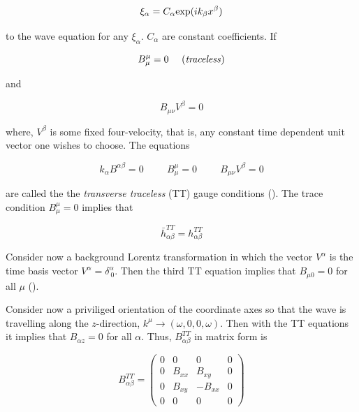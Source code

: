 \documentclass[epsf]{article}
\begin{document}
\begin{equation}
\xi_{\alpha} = C_{\alpha} {\rm exp}(i k_{\beta} x^{\beta})
\end{equation}

to the wave equation for any $\xi_{\alpha}$. $C_{\alpha}$ are constant 
coefficients. If

\begin{equation}
B^{\mu}_{\mu} = 0 ~~~~({\rm \it traceless})
\end{equation}

and

\begin{equation}
B_{\mu\nu} V^{\beta} = 0
\end{equation}

where, $V^{\beta}$ is some fixed four-velocity, that is, any constant 
time dependent unit vector one wishes to choose. The equations

\begin{equation}
\boxed{k_{\alpha} B^{\alpha\beta} = 0 \hspace{1cm}
B^{\mu}_{\mu} = 0 \hspace{1cm}
B_{\mu\nu} V^{\beta} = 0}
\end{equation}

 are called the the {\it transverse traceless} (TT) gauge 
conditions (\cite{schutz,maggiore,ian,chaky}). The trace condition $B^{\mu}_{\mu} = 0$ implies that

\begin{equation}
\bar{h}^{TT}_{\alpha\beta} = h^{TT}_{\alpha\beta}
\end{equation}

Consider now a background Lorentz transformation in
which the vector $V^{\alpha}$ is the time basis vector $V^{\alpha} = 
\delta^{\alpha}_{~0}$. Then the third TT equation implies that $B_{\mu 0} = 0$ for all
$\mu$ (\cite{maggiore,chaky}). 

Consider now a priviliged orientation of the coordinate axes so that the wave is travelling 
along the $z$-direction, $k^{\mu} \rightarrow (\omega, 0, 0, \omega)$. 
Then with the TT equations it implies that $B_{\alpha z} = 0$ for all
$\alpha$. Thus, $B^{TT}_{\alpha\beta}$ in matrix form is 

\begin{equation}
B^{TT}_{\alpha\beta} = \left( \begin{array}{cccc}
              0 & 0 & 0 & 0 \\
              0 & B_{xx} & B_{xy} & 0 \\
              0 & B_{xy} & -B_{xx} & 0 \\
              0 & 0 & 0 & 0 \end{array} \right)
\end{equation}
\end{document}
